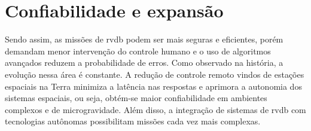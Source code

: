 \section{Confiabilidade e expansão}

Sendo assim, as missões de \gls{rvdb} podem ser mais seguras e eficientes, porém demandam menor intervenção do controle humano e o uso de algoritmos avançados reduzem a probabilidade de erros. Como observado na história, a evolução nessa área é constante.
A redução de controle remoto vindos de estações espaciais na Terra minimiza a latência nas respostas e aprimora a autonomia dos sistemas espaciais, ou seja, obtém-se maior confiabilidade em ambientes complexos e de microgravidade.
Além disso, a integração de sistemas de \gls{rvdb} com tecnologias autônomas possibilitam missões cada vez mais complexas.